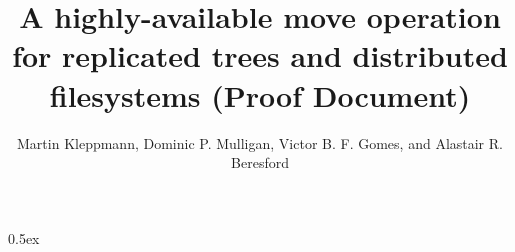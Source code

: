\documentclass[10pt]{article}
\begin{document}
\title{A highly-available move operation for replicated trees and distributed filesystems (Proof Document)}
\author{Martin Kleppmann, Dominic P. Mulligan, Victor B. F. Gomes, and Alastair R. Beresford}
\date{}
\maketitle
\tableofcontents
\parindent 0pt\parskip 0.5ex

\end{document}
